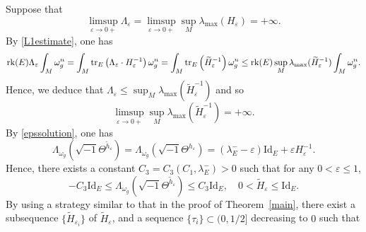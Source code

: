 \documentclass[12pt, reqno]{amsart}
\newcommand{\rk}{{\rm rk}}
\theoremstyle{plain}
\theoremstyle{definition}
\newcommand{\sq}{\sqrt{-1}}
\newcommand{\eps}{\varepsilon}
\newcommand{\beq}{\begin{equation}}
\newcommand{\eeq}{\end{equation}}
\renewcommand{\tilde}{\widetilde}
\renewcommand{\>}{\rightarrow}
\renewcommand{\>}{\rightarrow}
\renewcommand{\tilde}{\widetilde}
\numberwithin{equation}{section} %
\begin{document}
Suppose that \beq \limsup_{\eps\>0+}\Lambda_\eps = \limsup_{\eps\>0+}\sup_M \lambda_{\max}(H_\eps)=+\infty.\eeq
By \eqref{L1estimate}, one has \beq \rk(E)\Lambda_\eps\int_M
\omega_g^n = \int_M \mathrm{tr}_E\left(\Lambda_\eps \cdot
H_\eps^{-1}\right) \omega_g^n = \int_M \mathrm{tr}_E\left(\tilde
H_\eps^{-1}\right) \omega_g^n \leq  \rk(E)\sup_M
\lambda_{\mathrm{max}}(\tilde H_\eps^{-1})\int_M \omega_g^n. \eeq
Hence, we deduce that $ \Lambda_\eps \leq
\sup_M\lambda_{\mathrm{max}}(\tilde H_\eps^{-1})$ and so \beq
\label{minimaleigenvlueHeps} \limsup_{\eps\>0+}
\sup_M\lambda_{\mathrm{max}}(\tilde H_\eps^{-1}) = +\infty. \eeq By
\eqref{epssolution}, one has \beq \label{lambdasoltildeheps}
\Lambda_{\omega_g}\left(\sq \Theta^{\tilde h_\eps}\right)
=\Lambda_{\omega_g}\left(\sq \Theta^{h_\eps}\right) =
(\lambda_E^--\eps)\mathrm{Id}_E + \eps H_\eps^{-1}.\eeq Hence, there
exists a constant $ C_3 = C_3(C_1,\lambda_E^-) > 0 $ such that for
any $ 0 < \eps \leq 1 $, \beq -C_3\mathrm{Id}_E \leq
\Lambda_{\omega_g}\left(\sq \Theta^{\tilde h_\eps}\right)  \leq
C_3\mathrm{Id}_E, \quad 0 < \tilde H_\eps \leq \mathrm{Id}_E. \eeq
By using a strategy similar to that in the proof of
Theorem~\ref{main}, there exist a subsequence $\{\tilde
H_{\eps_i}\}$ of $\tilde H_\eps$, and a sequence $\{\tau_i\}\subset
(0,1/2]$ decreasing to $0$ such that
\end{document}
